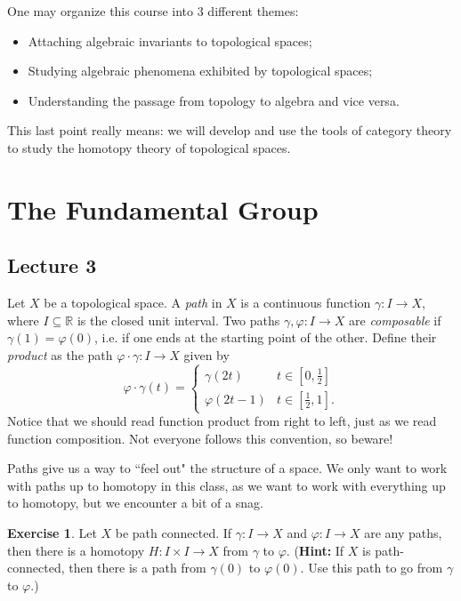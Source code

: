 \documentclass[10pt]{amsart}
\theoremstyle{definition}
\newtheorem{exercise}[thm]{Exercise}
\newcommand{\cdef}[1]{\textcolor{Bittersweet}{#1}}
\begin{document}
One may organize this course into 3 different themes:
\begin{itemize}
    \item Attaching algebraic invariants to topological spaces;
    \item Studying algebraic phenomena exhibited by topological spaces;
    \item Understanding the passage from topology to algebra and vice versa.
\end{itemize}
This last point really means: we will develop and use the tools of category theory to study the homotopy theory of topological spaces. 

\section{The Fundamental Group}
\subsection*{Lecture 3}
\hfill

Let $X$ be a topological space. A \cdef{\emph{path}} in $X$ is a continuous function $\gamma:I \to X$, where $I \subseteq \mathbb{R}$ is the closed unit interval. Two paths $\gamma, \varphi:I \to X$ are \cdef{\emph{composable}} if $\gamma(1) = \varphi(0)$, i.e. if one ends at the starting point of the other. Define their \cdef{\emph{product}} as the path $\varphi \cdot \gamma:I \to X$ given by
\[ \varphi \cdot \gamma(t) = \left\{ \begin{array}{ll}
    \gamma(2t) & t \in [0, \tfrac{1}{2}] \\
    \varphi(2t-1) & t \in [\tfrac{1}{2}, 1].
\end{array} \right.\]
Notice that we should read function product from right to left, just as we read function composition. Not everyone follows this convention, so beware!

Paths give us a way to ``feel out" the structure of a space. We only want to work with paths up to homotopy in this class, as we want to work with everything up to homotopy, but we encounter a bit of a snag.

\begin{exercise}
    Let $X$ be path connected. If $\gamma:I \to X$ and $\varphi:I \to X$ are any paths, then there is a homotopy $H:I \times I \to X$ from $\gamma$ to $\varphi$. (\textbf{Hint:} If $X$ is path-connected, then there is a path from $\gamma(0)$ to $\varphi(0)$. Use this path to go from $\gamma$ to $\varphi$.)
\end{exercise}
\end{document}
